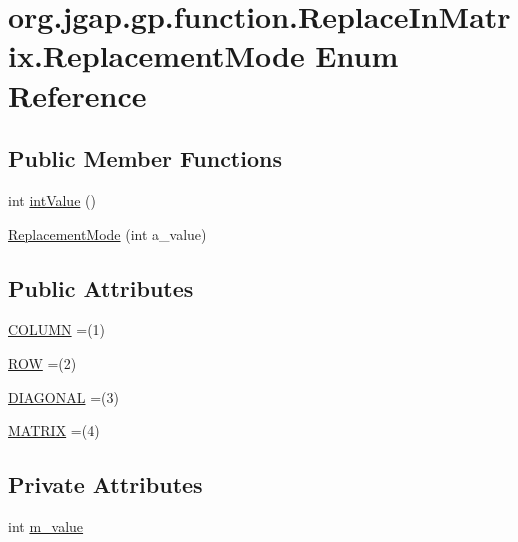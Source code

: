 \hypertarget{enumorg_1_1jgap_1_1gp_1_1function_1_1_replace_in_matrix_1_1_replacement_mode}{\section{org.\-jgap.\-gp.\-function.\-Replace\-In\-Matrix.\-Replacement\-Mode Enum Reference}
\label{enumorg_1_1jgap_1_1gp_1_1function_1_1_replace_in_matrix_1_1_replacement_mode}
}
\subsection*{Public Member Functions}
\begin{DoxyCompactItemize}
\item 
int \hyperlink{enumorg_1_1jgap_1_1gp_1_1function_1_1_replace_in_matrix_1_1_replacement_mode_a2eb8c56a23b36ef448c06303081f12e7}{int\-Value} ()
\item 
\hyperlink{enumorg_1_1jgap_1_1gp_1_1function_1_1_replace_in_matrix_1_1_replacement_mode_a2516668f81eca60dc751a71dff6778ab}{Replacement\-Mode} (int a\-\_\-value)
\end{DoxyCompactItemize}
\subsection*{Public Attributes}
\begin{DoxyCompactItemize}
\item 
\hyperlink{enumorg_1_1jgap_1_1gp_1_1function_1_1_replace_in_matrix_1_1_replacement_mode_ab8468e524a7c38698199a914575a23f0}{C\-O\-L\-U\-M\-N} =(1)
\item 
\hyperlink{enumorg_1_1jgap_1_1gp_1_1function_1_1_replace_in_matrix_1_1_replacement_mode_a3c057dd3f9d02c52027d162e05b5e26b}{R\-O\-W} =(2)
\item 
\hyperlink{enumorg_1_1jgap_1_1gp_1_1function_1_1_replace_in_matrix_1_1_replacement_mode_ad335308b54306fa05e92c7c4abfb57a8}{D\-I\-A\-G\-O\-N\-A\-L} =(3)
\item 
\hyperlink{enumorg_1_1jgap_1_1gp_1_1function_1_1_replace_in_matrix_1_1_replacement_mode_a778b3afc99ff1eb9476e9c5a258ed118}{M\-A\-T\-R\-I\-X} =(4)
\end{DoxyCompactItemize}
\subsection*{Private Attributes}
\begin{DoxyCompactItemize}
\item 
int \hyperlink{enumorg_1_1jgap_1_1gp_1_1function_1_1_replace_in_matrix_1_1_replacement_mode_aa4c75449a4f410ffd4042a5796604ca7}{m\-\_\-value}
\end{DoxyCompactItemize}


